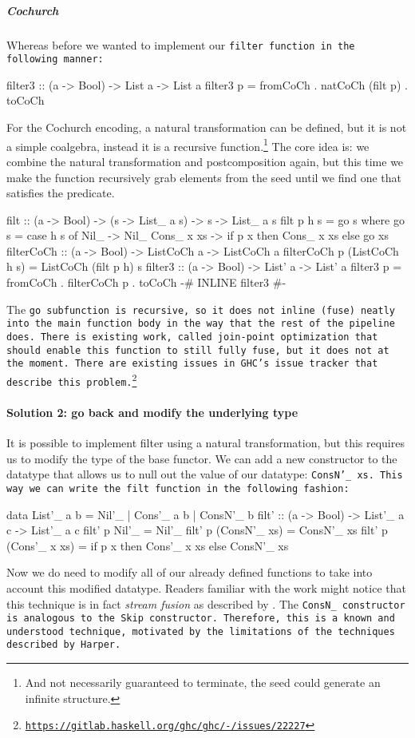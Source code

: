 \subparagraph{Cochurch}
Whereas before we wanted to implement our \tt{filter} function in the following manner:
\begin{spec}
filter3 :: (a -> Bool) -> List a -> List a
filter3 p = fromCoCh . natCoCh (filt p) . toCoCh
\end{spec}
For the Cochurch encoding, a natural transformation can be defined, but it is not a simple coalgebra, instead it is a recursive function.\footnote{And not necessarily guaranteed to terminate, the seed could generate an infinite structure.}
The core idea is: we combine the natural transformation and postcomposition again, but this time we make the function recursively grab elements from the seed until we find one that satisfies the predicate.
\begin{code}
filt :: (a -> Bool) -> (s -> List_ a s) -> s -> List_ a s
filt p h s = go s
  where go s = case h s of
          Nil_ -> Nil_
          Cons_ x xs -> if p x then Cons_ x xs else go xs
filterCoCh :: (a -> Bool) -> ListCoCh a -> ListCoCh a
filterCoCh p (ListCoCh h s) = ListCoCh (filt p h) s
filter3 :: (a -> Bool) -> List' a -> List' a
filter3 p = fromCoCh . filterCoCh p . toCoCh
{-# INLINE filter3 #-}
\end{code}
The \tt{go} subfunction is recursive, so it does not inline (fuse) neatly into the main function body in the way that the rest of the pipeline does.
There is existing work, called join-point optimization that should enable this function to still fully fuse, but it does not at the moment.
There are existing issues in GHC's issue tracker that describe this problem.\footnote{\url{https://gitlab.haskell.org/ghc/ghc/-/issues/22227}}


\paragraph{Solution 2: go back and modify the underlying type}
It is possible to implement filter using a natural transformation, but this requires us to modify the type of the base functor.
We can add a new constructor to the datatype that allows us to null out the value of our datatype: \tt{ConsN'\_ xs}.
This way we can write the \tt{filt} function in the following fashion:
\begin{code}
data List'_ a b = Nil'_ | Cons'_ a b | ConsN'_ b
filt' :: (a -> Bool) -> List'_ a c -> List'_ a c
filt' p Nil'_ = Nil'_
filt' p (ConsN'_ xs) = ConsN'_ xs
filt' p (Cons'_ x xs) = if p x then Cons'_ x xs else ConsN'_ xs
\end{code}
Now we do need to modify all of our already defined functions to take into account this modified datatype.
Readers familiar with the work might notice that this technique is in fact \textit{stream fusion} as described by \cite{Coutts2007}.
The \tt{ConsN\_} constructor is analogous to the \tt{Skip} constructor.
Therefore, this is a known and understood technique, motivated by the limitations of the techniques described by Harper.

